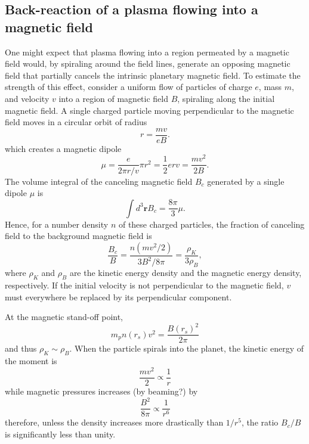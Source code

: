 \documentclass{emulateapj}
\begin{document}
\newpage


\subsection{Back-reaction of a plasma flowing into a magnetic field}
\label{ss:offset}

One might expect that plasma flowing into a region permeated by a magnetic field would, by spiraling around the field lines, generate an opposing magnetic field that partially cancels the intrinsic planetary magnetic field. 
To estimate the strength of this effect, consider a uniform flow of particles of charge $e$, mass $m$, and velocity $v$ into a region of magnetic field $B$, spiraling along the initial magnetic field. 
A single charged particle moving perpendicular to the magnetic field moves in a circular orbit of radius 
\begin{equation}
r=\frac{mv}{eB}.
\end{equation}
which creates a magnetic dipole
\begin{equation}
\mu = \frac{e}{2\pi r/v} \pi r^2 = \frac{1}{2} e r v = \frac{mv^2}{2B}.
\end{equation}
The volume integral of the canceling magnetic field $B_c$ generated by a single dipole $\mu$ is
\begin{equation}
\int d^3{\boldsymbol r} B_c = \frac{8\pi}{3} \mu.
\end{equation}
Hence, for a number density $n$ of these charged particles, the fraction of canceling field to the background magnetic field is
\begin{equation}
\frac{B_c}{B} = \frac{n(mv^2/2)}{3 B^2/8\pi}= \frac{\rho_K}{3\rho_B},
\end{equation}
where $\rho_K$ and $\rho_B$ are the kinetic energy density and the magnetic energy density, respectively. If the initial velocity is not perpendicular to the magnetic field, $v$ must everywhere be replaced by its perpendicular component.

%
At the magnetic stand-off point, 
\begin{equation}
m_p n(r_s) v^2 = \frac{B(r_s)^2}{2\pi }
\end{equation}
and thus $\rho_K \sim \rho _B$. When the particle spirals into the planet, the kinetic energy of the moment is
\begin{equation}
\frac{mv^2}{2} \propto \frac{1}{r}
\end{equation}
while magnetic pressures increases (by beaming?) by 
\begin{equation}
\frac{B^2}{8\pi } \propto \frac{1}{r^6}
\end{equation}
therefore, unless the density increases more drastically than $1/r^5$, the ratio $B_c/B$ is significantly less than unity. 
\end{document}
